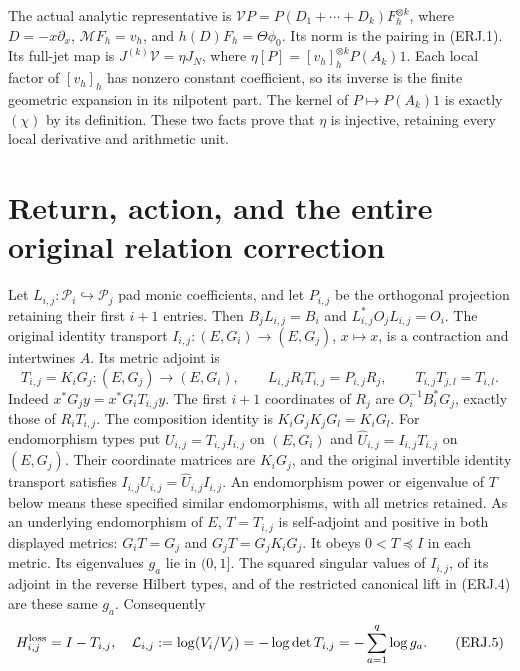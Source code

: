 \documentclass[11pt]{article}
\begin{document}
The actual analytic representative is
$\mathcal V P=P(D_1+\cdots+D_k)F_h^{\otimes k}$, where
$D=-x\partial_x$, $\mathcal MF_h=v_h$, and
$h(D)F_h=\Theta\phi_0$. Its norm is the pairing in (ERJ.1).
Its full-jet map is $J^{(k)}\mathcal V=\eta J_N$, where
$\eta[P]=[v_h]_h^{\otimes k}P(A_k)1$. Each local factor of
$[v_h]_h$ has nonzero constant coefficient, so its inverse is the
finite geometric expansion in its nilpotent part. The kernel of
$P\mapsto P(A_k)1$ is exactly $(\chi)$ by its definition.
These two facts prove that $\eta$ is injective, retaining every local
derivative and arithmetic unit.

\section{Return, action, and the entire original relation correction}
Let $L_{i,j}:\mathcal P_i\hookrightarrow\mathcal P_j$ pad monic
coefficients, and let $P_{i,j}$ be the orthogonal projection retaining
their first $i+1$ entries. Then $B_jL_{i,j}=B_i$ and
$L_{i,j}^*O_jL_{i,j}=O_i$. The original identity transport
$I_{i,j}:(E,G_i)\to(E,G_j)$, $x\mapsto x$, is a contraction and
intertwines $A$. Its metric adjoint is
\[
 T_{i,j}=K_iG_j:(E,G_j)\longrightarrow(E,G_i),\qquad
 L_{i,j}R_iT_{i,j}=P_{i,j}R_j,\qquad
 T_{i,j}T_{j,l}=T_{i,l}.\tag{ERJ.4}
\]
Indeed $x^*G_jy=x^*G_iT_{i,j}y$. The first $i+1$ coordinates of
$R_j$ are $O_i^{-1}B_i^*G_j$, exactly those of $R_iT_{i,j}$.
The composition identity is $K_iG_jK_jG_l=K_iG_l$.
For endomorphism types put $U_{i,j}=T_{i,j}I_{i,j}$ on $(E,G_i)$
and $\widehat U_{i,j}=I_{i,j}T_{i,j}$ on $(E,G_j)$.
Their coordinate matrices are $K_iG_j$, and the original invertible
identity transport satisfies $I_{i,j}U_{i,j}=\widehat U_{i,j}I_{i,j}$.
An endomorphism power or eigenvalue of $T$ below means these
specified similar endomorphisms, with all metrics retained.
As an underlying endomorphism of $E$, $T=T_{i,j}$ is self-adjoint
and positive in both displayed metrics: $G_iT=G_j$ and
$G_jT=G_jK_iG_j$. It obeys $0<T\preceq I$ in each metric.
Its eigenvalues $g_a$ lie in $(0,1]$. The squared singular values
of $I_{i,j}$, of its adjoint in the reverse Hilbert types, and of the
restricted canonical lift in (ERJ.4) are these same $g_a$.
Consequently
\[
 H_{i,j}^{\rm loss}=I-T_{i,j},\quad
 \mathcal L_{i,j}:=\log(V_i/V_j)
 =-\log\det T_{i,j}=-\sum_{a=1}^q\log g_a.\tag{ERJ.5}
\]
\end{document}

